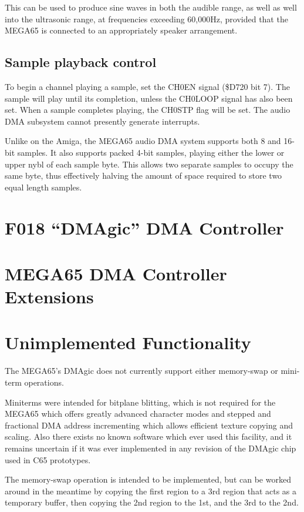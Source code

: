 This can be used to produce sine waves in both the audible range, as
well as well into the ultrasonic range, at frequencies exceeding
60,000Hz, provided that the MEGA65 is connected to an appropriately
speaker arrangement.

\subsection{Sample playback control}

To begin a channel playing a sample, set the CH0EN signal (\$D720 bit
7). The sample will play until its completion, unless the CH0LOOP
signal has also been set. When a sample completes playing, the CH0STP
flag will be set.  The audio DMA subsystem cannot presently generate
interrupts.

Unlike on the Amiga\texttrademark, the MEGA65 audio DMA system supports both
8 and 16-bit samples.  It also supports packed 4-bit samples, playing
either the lower or upper nybl of each sample byte.  This allows two
separate samples to occupy the same byte, thus effectively halving the
amount of space required to store two equal length samples.

\section{F018 ``DMAgic'' DMA Controller}



\section{MEGA65 DMA Controller Extensions}



\section{Unimplemented Functionality}

The MEGA65's DMAgic does not currently support either memory-swap or
mini-term operations.

Miniterms were intended for bitplane blitting,
which is not required for the MEGA65 which offers greatly advanced
character modes and stepped and fractional DMA address incrementing
which allows efficient texture copying and scaling. Also there exists
no known software which ever used this facility, and it remains
uncertain if it was ever implemented in any revision of the DMAgic
chip used in C65 prototypes.

The memory-swap
operation is intended to be implemented, but can be worked around in
the meantime by copying the first region to a 3rd region that acts as
a temporary buffer, then copying the 2nd region to the 1st, and the
3rd to the 2nd.
